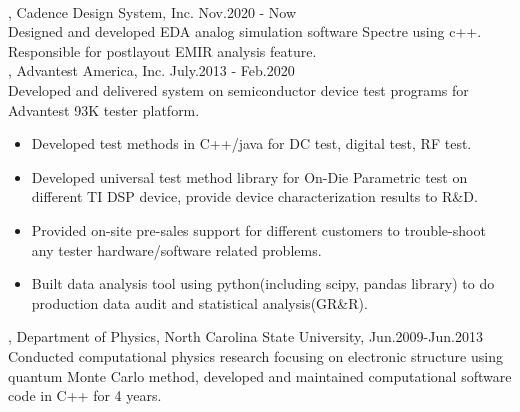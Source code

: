 \documentclass[11pt]{article} %
\begin{document}
\\
, Cadence Design System, Inc. Nov.2020 - Now\\
\noindent Designed and developed EDA analog simulation software Spectre using c++. Responsible for
postlayout EMIR analysis feature.\\
, Advantest America, Inc. July.2013 - Feb.2020\\
\noindent Developed and delivered system on semiconductor device test programs for Advantest 93K tester platform.\\ 
\begin{itemize}
  
    \item Developed test methods in C++/java for DC test, digital test, RF test.\\
 \vspace{-4mm}
    \item  Developed universal test method library for On-Die Parametric test on different TI DSP device, provide device characterization results to R\&D.\\ 
 \vspace{-4mm}
  \item Provided on-site pre-sales support for different customers to trouble-shoot any tester hardware/software related problems.\\ 
  \vspace{-4mm}
 \item  Built data analysis tool using python(including scipy, pandas library) to do production data audit and statistical analysis(GR\&R).

  
 \end{itemize}

, Department of Physics, North Carolina State University, Jun.2009-Jun.2013\\
\noindent Conducted computational physics research focusing on electronic structure using quantum Monte Carlo method, developed and maintained computational software code in C++ for 4 years.\\
\end{document}
